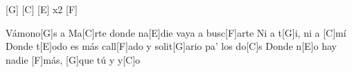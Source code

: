 \begin{guitar}
\begin{multicols}{2}
		\newline
		[F] \hspace{0.5cm} [G] \hspace{0.5cm} [C] \hspace{0.5cm} [E] \hspace{0.3cm} x2 \hspace{0.3cm} [F]

		\newline		
		Vámono[G]s a Ma[C]rte donde na[E]die vaya a busc[F]arte
		Ni a t[G]i, ni a [C]mí
		Donde t[E]odo es más call[F]ado y solit[G]ario pa' los do[C]s
		Donde n[E]o hay nadie [F]más, [G]que tú y y[C]o
	\end{multicols}
\end{guitar}
